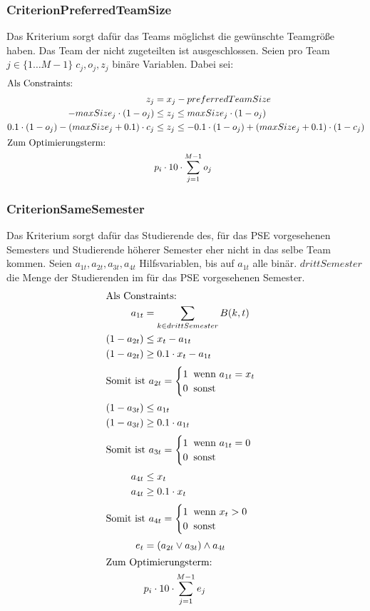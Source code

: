 \documentclass[parskip=full]{scrartcl}
\begin{document}
\subsubsection{CriterionPreferredTeamSize}
Das Kriterium sorgt dafür das Teams möglichst die gewünschte Teamgröße haben.
Das Team der nicht zugeteilten ist ausgeschlossen. Seien pro Team $j \in \{1\ldots M-1 \} \; c_j,o_j,z_j$ binäre Variablen.
Dabei sei: 
\begin{align*}
\intertext{Als Constraints: }
z_j &=x_j - preferredTeamSize\\
-maxSize_j \cdot (1-o_j) &\le z_j \le maxSize_j \cdot (1-o_j)\\
0.1\cdot(1-o_j) - (maxSize_j + 0.1)\cdot c_j &\le z_j \le -0.1\cdot
(1-o_j)+(maxSize_j +0.1)\cdot(1-c_j)\\
\intertext{Zum Optimierungsterm:} 
 &p_i \cdot 10 \cdot \sum_{j = 1}^{M-1}
o_j
\end{align*}
\subsubsection{CriterionSameSemester}
Das Kriterium sorgt dafür das Studierende des, für das PSE vorgesehenen
Semesters und Studierende höherer Semester eher nicht in das selbe Team kommen. 
Seien $a_{1t},a_{2t},a_{3t},a_{4t}$ Hilfsvariablen, bis auf $a_{1t}$ alle binär.
$drittSemester$ die Menge der Studierenden im für das PSE vorgesehenen Semester.
\begin{align*}
\intertext{Als Constraints:} 
a_{1t} &= \sum_{k \in drittSemester} B(k,t) \\
(1 - a_{2t}) &\le x_t - a_{1t} \\ (1 - a_{2t}) &\ge 0.1 \cdot x_t - a_{1t} \\
\intertext{$\text{Somit ist } a_{2t} = \begin{cases}
    1 \;\; \text{wenn $a_{1t} = x_t$} \\
    0 \;\; \text{sonst} 
\end{cases}$}
(1-a_{3t}) &\le a_{1t} \\
(1-a_{3t}) &\ge 0.1 \cdot a_{1t}\\
\intertext{$\text{Somit ist } a_{3t} = \begin{cases}
    1 \;\; \text{wenn $a_{1t} = 0$} \\
    0 \;\; \text{sonst} 
\end{cases}$}
a_{4t} &\le x_t \\
a_{4t} &\ge 0.1 \cdot x_t \\
\intertext{$\text{Somit ist } a_{4t} = \begin{cases}
    1 \;\; \text{wenn $x_t > 0$} \\
    0 \;\; \text{sonst} 
\end{cases}$}
e_t &= (a_{2t} \vee a_{3t}) \wedge a_{4t}\\
\intertext{Zum Optimierungsterm:} 
&p_i \cdot 10 \cdot \sum_{j=1 }^{M-1} e_j
\end{align*}
\end{document}

